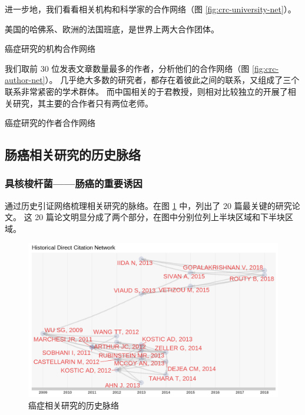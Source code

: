 \documentclass[]{ctexbook}
\begin{document}
进一步地，我们看看相关机构和科学家的合作网络（图 \ref{fig:crc-university-net}）。

美国的哈佛系、欧洲的法国班底，是世界上两大合作团体。

\hypertarget{htmlwidget-d3edf43e2a965634778b}{}

\label{fig:crc-university-net}癌症研究的机构合作网络

我们取前 30 位发表文章数量最多的作者，分析他们的合作网络（图 \ref{fig:crc-author-net}）。
几乎绝大多数的研究者，都存在着彼此之间的联系，又组成了三个联系非常紧密的学术群体。
而中国相关的于君教授，则相对比较独立的开展了相关研究，其主要的合作者只有两位老师。

\hypertarget{htmlwidget-1ed7a6832cff2f2bc719}{}

\label{fig:crc-author-net}癌症研究的作者合作网络

\hypertarget{ux80a0ux764cux76f8ux5173ux7814ux7a76ux7684ux5386ux53f2ux8109ux7edc}{%
\subsection{肠癌相关研究的历史脉络}\label{ux80a0ux764cux76f8ux5173ux7814ux7a76ux7684ux5386ux53f2ux8109ux7edc}}

\hypertarget{ux5177ux6838ux68adux6746ux83ccux80a0ux764cux7684ux91cdux8981ux8bf1ux56e0}{%
\subsubsection{具核梭杆菌------肠癌的重要诱因}\label{ux5177ux6838ux68adux6746ux83ccux80a0ux764cux7684ux91cdux8981ux8bf1ux56e0}}

通过历史引证网络梳理相关研究的脉络。在图 \ref{fig:crc-histplot} 中，列出了 20 篇最关键的研究论文。
这 20 篇论文明显分成了两个部分，在图中分别位列上半块区域和下半块区域。

\begin{figure}
\includegraphics[width=1\linewidth]{plots/crc-histplot-1} \caption{癌症相关研究的历史脉络}\label{fig:crc-histplot}
\end{figure}
\end{document}
